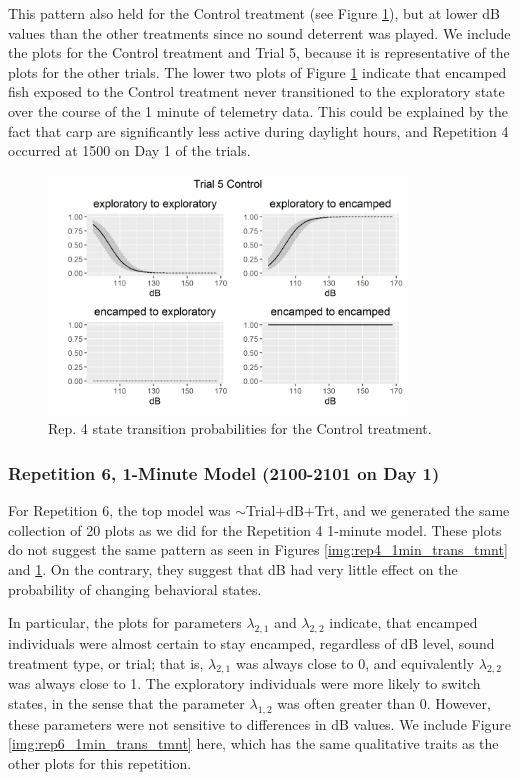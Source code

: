 \documentclass[12pt]{article}
\begin{document}
	This pattern also held for the Control treatment (see Figure \ref{img:rep4_1min_trans_control}), but at lower dB values than the other treatments since no sound deterrent was played. We include the plots for the Control treatment and Trial 5, because it is representative of the plots for the other trials. The lower two plots of Figure \ref{img:rep4_1min_trans_control} indicate that encamped fish exposed to the Control treatment never transitioned to the exploratory state over the course of the 1 minute of telemetry data. This could be explained by the fact that carp are significantly less active during daylight hours, and Repetition 4 occurred at 1500 on Day 1 of the trials.
	
	\begin{figure}
		\centering
		\includegraphics[width=0.85\textwidth]{trans_rep_4_trial_5_Control.png}
		\caption{Rep. 4 state transition probabilities for the Control treatment.}
		\label{img:rep4_1min_trans_control}
	\end{figure}
	
	\subsubsection{Repetition 6, 1-Minute Model (2100-2101 on Day 1)}
	
	For Repetition 6, the top model was $\sim$Trial+dB+Trt, and we generated the same collection of 20 plots as we did for the Repetition 4 1-minute model. These plots do not suggest the same pattern as seen in Figures \ref{img:rep4_1min_trans_tmnt} and \ref{img:rep4_1min_trans_control}. On the contrary, they suggest that dB had very little effect on the probability of changing behavioral states. 
	
	In particular, the plots for parameters $\lambda_{2, 1}$ and $\lambda_{2, 2}$ indicate, that encamped individuals were almost certain to stay encamped, regardless of dB level, sound treatment type, or trial; that is, $\lambda_{2, 1}$ was always close to 0, and equivalently $\lambda_{2, 2}$ was always close to 1. The exploratory individuals were more likely to switch states, in the sense that the parameter $\lambda_{1, 2}$ was often greater than 0. However, these parameters were not sensitive to differences in dB values. We include Figure \ref{img:rep6_1min_trans_tmnt} here, which has the same qualitative traits as the other plots for this repetition.
	
\end{document}
